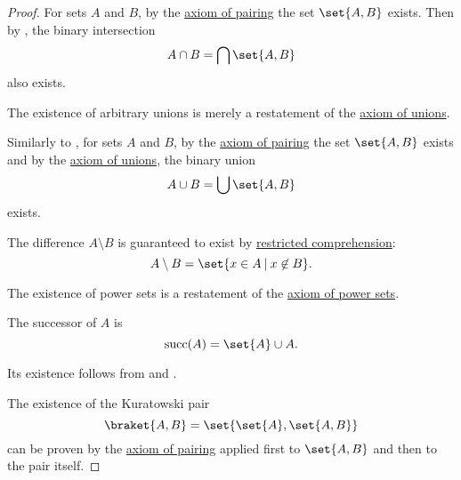 \begin{proof}
   For sets \( A \) and \( B \), by the \hyperref[def:zfc/pairing]{axiom of pairing} the set \( \set{ A, B } \) exists. Then by , the binary intersection
  \begin{equation*}
    A \cap B = \bigcap \set{ A, B }
  \end{equation*}
  also exists.

   The existence of arbitrary unions is merely a restatement of the \hyperref[def:zfc/union]{axiom of unions}.

   Similarly to , for sets \( A \) and \( B \), by the \hyperref[def:zfc/pairing]{axiom of pairing} the set \( \set{ A, B } \) exists and by the \hyperref[def:zfc/union]{axiom of unions}, the binary union
  \begin{equation*}
    A \cup B = \bigcup \set{ A, B }
  \end{equation*}
  exists.

   The difference \( A \setminus B \) is guaranteed to exist by \hyperref[def:zfc/specification]{restricted comprehension}:
  \begin{equation*}
    A \setminus B = \set{ x \in A \given x \not\in B }.
  \end{equation*}

   The existence of power sets is a restatement of the \hyperref[def:zfc/power_set]{axiom of power sets}.

   The successor of \( A \) is
  \begin{equation*}
    \op{succ}(A) = \set{ A } \cup A.
  \end{equation*}

  Its existence follows from  and .

   The existence of the Kuratowski pair
  \begin{equation*}
    \braket{ A, B } = \set{ \set{ A }, \set{ A, B } }
  \end{equation*}
  can be proven by the \hyperref[def:zfc/pairing]{axiom of pairing} applied first to \( \set{ A, B } \) and then to the pair itself.


\end{proof}
